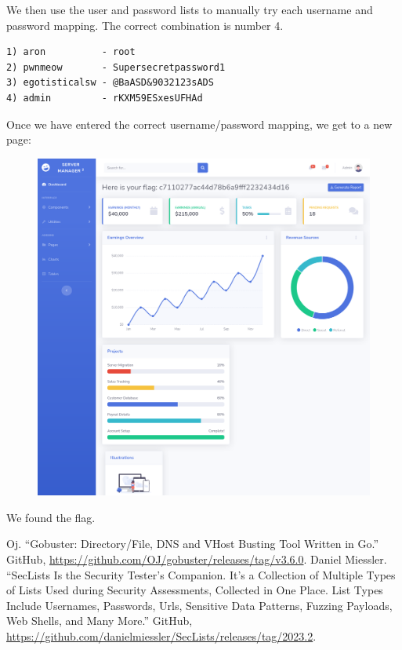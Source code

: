 \documentclass[conference]{IEEEtran}
\begin{document}
We then use the user and password lists to manually try each username and password mapping. The correct combination is number 4.


\begin{scriptsize}
\begin{verbatim}
1) aron          - root
2) pwnmeow       - Supersecretpassword1
3) egotisticalsw - @BaASD&9032123sADS
4) admin         - rKXM59ESxesUFHAd
\end{verbatim}
\end{scriptsize}


Once we have entered the correct username/password mapping, we get to a new page:


\begin{figure}[htb]
\includegraphics[scale=0.1]{flag.png}
\centering
\end{figure}

We found the flag.


\begin{thebibliography}{00}

 Oj. “Gobuster: Directory/File, DNS and VHost Busting Tool Written in Go.” GitHub, \url{https://github.com/OJ/gobuster/releases/tag/v3.6.0}.
 Daniel Miessler. “SecLists Is the Security Tester’s Companion. It’s a Collection of Multiple Types of Lists Used during Security Assessments, Collected in One Place. List Types Include Usernames, Passwords, Urls, Sensitive Data Patterns, Fuzzing Payloads, Web Shells, and Many More.” GitHub, \url{https://github.com/danielmiessler/SecLists/releases/tag/2023.2}.

\end{thebibliography}
\vspace{12pt}
\end{document}
